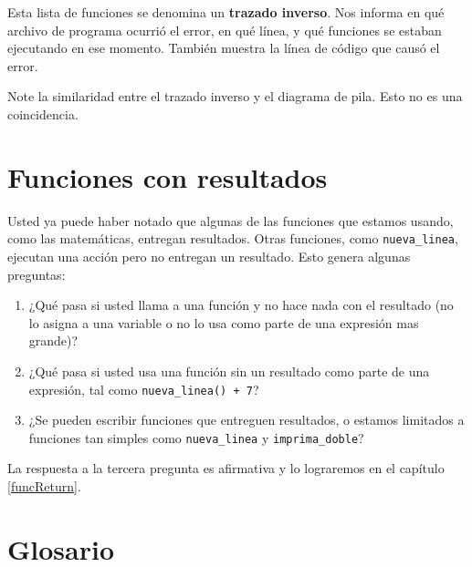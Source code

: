 Esta lista de funciones se denomina un {\bf trazado inverso}. Nos informa
en qué archivo de programa ocurrió el error, en qué línea, y qué funciones
se estaban ejecutando en ese momento. También muestra la línea de código que
causó el error.


Note la similaridad entre el trazado inverso y el diagrama de pila. Esto no 
es una coincidencia.

\section{Funciones con resultados}

Usted ya puede haber notado que algunas de las funciones que estamos usando,
como las matemáticas, entregan resultados. Otras funciones, como 
\texttt{nueva\_linea}, ejecutan una acción pero no entregan un resultado. Esto 
genera algunas preguntas:

\begin{enumerate}
	\item ¿Qué pasa si usted llama a una función y no hace nada con el 
	resultado (no lo 
	asigna a una variable o no lo usa como parte de una expresión mas grande)?
	
	\item ¿Qué pasa si usted usa una función sin un resultado como parte de 
	una expresión, tal como  \texttt{nueva\_linea() + 7}?
	
	\item ¿Se pueden escribir funciones que entreguen resultados, o estamos 
	limitados
	a funciones tan simples como \texttt{nueva\_linea} y 
	\texttt{imprima\_doble}?
\end{enumerate}

La respuesta a la tercera pregunta es afirmativa y lo lograremos en el capítulo \ref{funcReturn}.

\section{Glosario}

